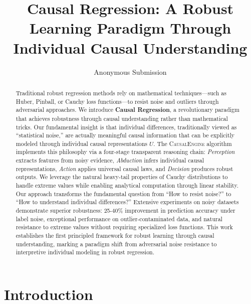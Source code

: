 \documentclass[letterpaper]{article} %
\title{Causal Regression: A Robust Learning Paradigm Through Individual Causal Understanding}
\author{
    Anonymous Submission
}
\newcommand{\causalengine}{\textsc{CausalEngine}}
\begin{document}
\maketitle

\begin{abstract}
Traditional robust regression methods rely on mathematical techniques—such as Huber, Pinball, or Cauchy loss functions—to resist noise and outliers through adversarial approaches. We introduce \textbf{Causal Regression}, a revolutionary paradigm that achieves robustness through causal understanding rather than mathematical tricks. Our fundamental insight is that individual differences, traditionally viewed as ``statistical noise,'' are actually meaningful causal information that can be explicitly modeled through individual causal representations $U$. The \causalengine{} algorithm implements this philosophy via a four-stage transparent reasoning chain: \textit{Perception} extracts features from noisy evidence, \textit{Abduction} infers individual causal representations, \textit{Action} applies universal causal laws, and \textit{Decision} produces robust outputs. We leverage the natural heavy-tail properties of Cauchy distributions to handle extreme values while enabling analytical computation through linear stability. Our approach transforms the fundamental question from ``How to resist noise?'' to ``How to understand individual differences?'' Extensive experiments on noisy datasets demonstrate superior robustness: 25-40\% improvement in prediction accuracy under label noise, exceptional performance on outlier-contaminated data, and natural resistance to extreme values without requiring specialized loss functions. This work establishes the first principled framework for robust learning through causal understanding, marking a paradigm shift from adversarial noise resistance to interpretive individual modeling in robust regression.
\end{abstract}


\section{Introduction}
\end{document}
